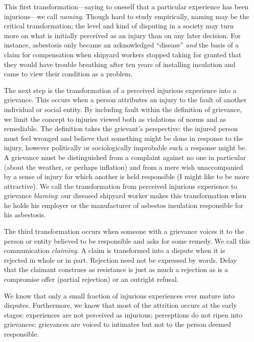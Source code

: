 \documentclass[11pt,letterpaper,twoside]{article}
\begin{document}
This first transformation---saying to oneself that a particular
experience has been injurious---we call \emph{naming}. Though hard to
study empirically, naming may be the critical transformation; the level
and kind of disputing in a society may turn more on what is initially
perceived as an injury than on any later decision. For instance,
asbestosis only became an acknowledged ``disease'' \emph{and} the basis
of a claim for compensation when shipyard workers stopped taking for
granted that they would have trouble breathing after ten years of
installing insulation and came to view their condition as a problem.

The next step is the transformation of a perceived injurious experience
into a grievance. This occurs when a person attributes an injury to the
fault of another individual or social entity. By including fault within
the definition of grievance, we limit the concept to injuries viewed
both as violations of norms and as remediable. The definition takes the
grievant's perspective: the injured person must feel wronged and believe
that something might be done in response to the injury, however
politically or sociologically improbable such a response might be. A
grievance must be distinguished from a complaint against no one in
particular (about the weather, or perhaps inflation) and from a mere
wish unaccompanied by a sense of injury for which another is held
responsible (I might like to be more attractive). We call the
transformation from perceived injurious experience to grievance
\emph{blaming}: our diseased shipyard worker makes this transformation
when he holds his employer or the manufacturer of asbestos insulation
responsible for his asbestosis.

The third transformation occurs when someone with a grievance voices it
to the person or entity believed to be responsible and asks for some
remedy. We call this communication \emph{claiming}. A claim is
transformed into a dispute when it is rejected in whole or in part.
Rejection need not be expressed by words. Delay that the claimant
construes as resistance is just as much a rejection as is a compromise
offer (partial rejection) or an outright refusal.

We know that only a small fraction of injurious experiences ever mature
into disputes. Furthermore, we know that most of the attrition occurs at
the early stages: experiences are not perceived as injurious;
perceptions do not ripen into grievances; grievances are voiced to
intimates but not to the person deemed responsible.
\end{document}

